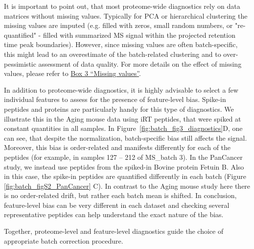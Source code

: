 \documentclass[num-refs]{wiley-article}
\begin{document}
It is important to point out, that most proteome-wide diagnostics rely on data matrices without missing values. Typically for PCA or hierarchical clustering the missing values are imputed (e.g. filled with zeros, small random numbers, or "re-quantified" - filled with summarized MS signal within the projected retention time peak boundaries). However, since missing values are often batch-specific, this might lead to an overestimate of the batch-related clustering and to over-pessimistic assessment of data quality. For more details on the effect of missing values, please refer to \hyperref[box:Box3_missingness]{Box 3 “Missing values”}.

In addition to proteome-wide diagnostics, it is highly advisable to select a few individual features to assess for the presence of feature-level bias. Spike-in peptides and proteins are particularly handy for this type of diagnostics. We illustrate this in the Aging mouse data using iRT peptides, that were spiked at constant quantities in all samples. In Figure~\ref{fig:batch_fig3_diagnostics}D, one can see, that despite the normalization, batch-specific bias still affects the signal. Moreover, this bias is order-related and manifests differently for each of the peptides (for example, in samples 127 – 212 of MS\_batch 3). In the PanCancer study, we instead use peptides from the spiked-in Bovine protein Fetuin B. Also in this case, the spike-in peptides are quantified differently in each batch (Figure \ref{fig:batch_figS2_PanCancer} {C}). In contrast to the Aging mouse study here there is no order-related drift, but rather each batch mean is shifted. In conclusion, feature-level bias can be very different in each dataset and checking several representative peptides can help understand the exact nature of the bias.

Together, proteome-level and feature-level diagnostics guide the choice of appropriate batch correction procedure.
\end{document}
